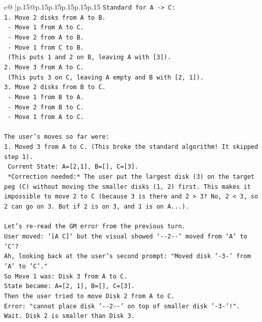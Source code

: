 \documentclass{article}
\begin{document}
{\begin{supertabular}{c@{$\;$}|p{.15\linewidth}@{}p{.15\linewidth}p{.15\linewidth}p{.15\linewidth}p{.15\linewidth}p{.15\linewidth}}
{{{\texttt{Standard for A {-}> C:} \\
\texttt{1. Move 2 disks from A to B.} \\
\texttt{   {-} Move 1 from A to C.} \\
\texttt{   {-} Move 2 from A to B.} \\
\texttt{   {-} Move 1 from C to B.} \\
\texttt{   (This puts 1 and 2 on B, leaving A with {[}3{]}).} \\
\texttt{2. Move 3 from A to C.} \\
\texttt{   (This puts 3 on C, leaving A empty and B with {[}2, 1{]}).} \\
\texttt{3. Move 2 disks from B to C.} \\
\texttt{   {-} Move 1 from B to A.} \\
\texttt{   {-} Move 2 from B to C.} \\
\texttt{   {-} Move 1 from A to C.} \\
\\ 
\texttt{The user's moves so far were:} \\
\texttt{1. Moved 3 from A to C. (This broke the standard algorithm! It skipped step 1).} \\
\texttt{   Current State: A={[}2,1{]}, B={[}{]}, C={[}3{]}.} \\
\texttt{   *Correction needed:* The user put the largest disk (3) on the target peg (C) without moving the smaller disks (1, 2) first. This makes it impossible to move 2 to C (because 3 is there and 2 > 3? No, 2 < 3, so 2 can go on 3. But if 2 is on 3, and 1 is on A...).} \\
\\ 
\texttt{Let's re{-}read the GM error from the previous turn.} \\
\texttt{User moved: `{[}A C{]}` but the visual showed `{-}{-}2{-}{-}` moved from `A` to `C`?} \\
\texttt{Ah, looking back at the user's second prompt: "Moved disk '{-}3{-}' from 'A' to 'C'."} \\
\texttt{So Move 1 was: Disk 3 from A to C.} \\
\texttt{State became: A={[}2, 1{]}, B={[}{]}, C={[}3{]}.} \\
\texttt{Then the user tried to move Disk 2 from A to C.} \\
\texttt{Error: "cannot place disk '{-}{-}2{-}{-}' on top of smaller disk '{-}3{-}'!".} \\
\texttt{Wait. Disk 2 is smaller than Disk 3.} \\
}}}
\end{supertabular}}
\end{document}
